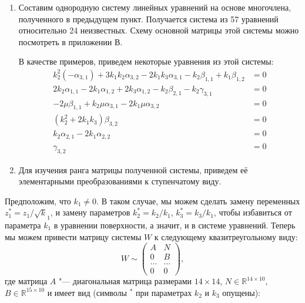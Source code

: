 \documentclass[../main.tex]{subfiles}
\begin{document}
\begin{enumerate}
\item Составим однородную систему линейных уравнений на основе многочлена, полученного в предыдущем пункт. Получается система из 57 уравнений относительно 24 неизвестных. Схему основной матрицы этой системы можно посмотреть в приложении В.

В качестве примеров, приведем некоторые уравнения из этой системы:
\begin{equation}
\begin{aligned}
k_2^2 \left(-\alpha _{3,1}\right)+3 k_1 k_2 \alpha _{3,2}-2 k_1 k_3 \alpha _{3,1}-k_2 \beta _{1,1}+k_1 \beta _{1,2} &= 0 \\
2 k_2 \alpha _{1,1}-2 k_1 \alpha _{1,2}+2 k_3 \alpha _{1,2}-k_2 \beta _{2,1}-k_2 \gamma _{3,1} &=0 \\
-2 \mu  \beta _{1,1}+k_2 \mu  \alpha _{3,1}-2 k_1 \mu  \alpha _{3,2} &= 0 \\
\left(k_2^2 + 2 k_1 k_3\right) \beta _{3,2} &=0 \\
k_2 \alpha _{2,1}-2 k_1 \alpha _{2,2} &= 0 \\
\gamma_{3,2} &= 0
\end{aligned}
\end{equation}
\item Для изучения ранга матрицы полученной системы, приведем её элементарными преобразованиями к ступенчатому виду.
\end{enumerate}

Предположим, что $k_1 \ne 0$. В таком случае, мы можем сделать замену переменных $z^*_1 = z_1
/ \sqrt k_1$, и замену параметров $k^*_2 = k_2 / k_1$, $k^*_3 = k_3 / k_1$, чтобы избавиться от параметра $k_1$ в уравнении поверхности, а значит, и в системе уравнений. Теперь мы можем привести матрицу системы $W$ к следующему квазитреугольному виду:
\begin{equation*}
W \sim
\begin{pmatrix}
A & N \\
0 & B \\
\hdots & \hdots  \\
0 & 0
\end{pmatrix},
\end{equation*}
где матрица $A$ "--- диагональная матрица размерами $14\times14$, $N\in \mathbb{R}^{14\times10}$, $B \in \mathbb{R}^{15\times10}$ и имеет вид (символы ${}^*$ при параметрах $k_2$ и $k_3$ опущены):
\end{document}
